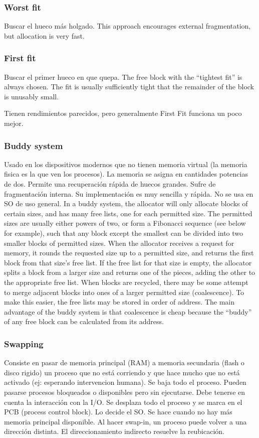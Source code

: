 \documentclass[a4paper, twoside]{article}
\begin{document}
\subsubsection{Worst fit}
Buscar el hueco más holgado.
This approach encourages external fragmentation, but allocation is very fast.

\subsubsection{First fit}
Buscar el primer hueco en que quepa.
The free block with the “tightest fit” is always chosen. The fit is usually sufficiently tight that the remainder of the block is unusably small.

Tienen rendimientos parecidos, pero generalmente First Fit funciona un poco mejor.

\subsubsection{Buddy system} 
Usado en los dispositivos modernos que no tienen memoria virtual (la memoria fisica es la que ven los procesos). 
La memoria se asigna en cantidades potencias de dos.
Permite una recuperación rápida de huecos grandes. Sufre de fragmentación interna. Su implementación es muy sencilla y rápida.
No se usa en SO de uso general.
In a buddy system, the allocator will only allocate blocks of certain sizes, and has many free lists, one for each permitted size. The permitted sizes are usually either powers of two, or form a Fibonacci sequence (see below for example), such that any block except the smallest can be divided into two smaller blocks of permitted sizes.
When the allocator receives a request for memory, it rounds the requested size up to a permitted size, and returns the first block from that size’s free list. If the free list for that size is empty, the allocator splits a block from a larger size and returns one of the pieces, adding the other to the appropriate free list.
When blocks are recycled, there may be some attempt to merge adjacent blocks into ones of a larger permitted size (coalescence). To make this easier, the free lists may be stored in order of address. The main advantage of the buddy system is that coalescence is cheap because the “buddy” of any free block can be calculated from its address.

\subsubsection{Swapping}
Consiste en pasar de memoria principal (RAM) a memoria secundaria (flash o disco rigido) un proceso que no está corriendo y que hace mucho que no está activado (ej: esperando intervencion humana). Se baja todo el proceso. Pueden pasarse procesos bloqueados o disponibles pero sin ejecutarse.
Debe tenerse en cuenta la interacción con la I/O.
Se desplaza todo el proceso y se marca en el PCB (process control block). Lo decide el SO.
Se hace cuando no hay más memoria principal disponible. 
Al hacer swap-in, un proceso puede volver a una dirección distinta. El direccionamiento indirecto resuelve la reubicación.
\end{document}

